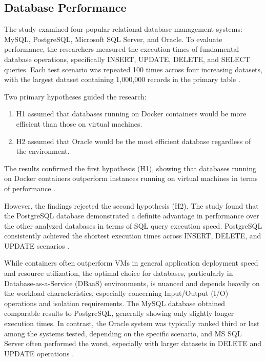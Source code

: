 \subsection{Database Performance}
The study examined four popular relational database management systems: MySQL, PostgreSQL, Microsoft SQL Server, and Oracle. To evaluate performance, the researchers measured the execution times of fundamental database operations, specifically INSERT, UPDATE, DELETE, and SELECT queries. Each test scenario was repeated 100 times across four increasing datasets, with the largest dataset containing 1,000,000 records in the primary table \cite{Performance_analysis_of_databases_created_in_virtualized_and_containerized_environment}.

Two primary hypotheses guided the research:
\begin{enumerate}
    \item H1 assumed that databases running on Docker containers would be more efficient than those on virtual machines.
    \item H2 assumed that Oracle would be the most efficient database regardless of the environment.
\end{enumerate}

The results confirmed the first hypothesis (H1), showing that databases running on Docker containers outperform instances running on virtual machines in terms of performance \cite{Performance_analysis_of_databases_created_in_virtualized_and_containerized_environment}.

However, the findings rejected the second hypothesis (H2). The study found that the PostgreSQL database demonstrated a definite advantage in performance over the other analyzed databases in terms of SQL query execution speed. PostgreSQL consistently achieved the shortest execution times across INSERT, DELETE, and UPDATE scenarios \cite{Performance_analysis_of_databases_created_in_virtualized_and_containerized_environment}.

While containers often outperform VMs in general application deployment speed and resource utilization, the optimal choice for databases, particularly in Database-as-a-Service (DBaaS) environments, is nuanced and depends heavily on the workload characteristics, especially concerning Input/Output (I/O) operations and isolation requirements. The MySQL database obtained comparable results to PostgreSQL, generally showing only slightly longer execution times. In contrast, the Oracle system was typically ranked third or last among the systems tested, depending on the specific scenario, and MS SQL Server often performed the worst, especially with larger datasets in DELETE and UPDATE operations \cite{Performance_analysis_of_databases_created_in_virtualized_and_containerized_environment}.

